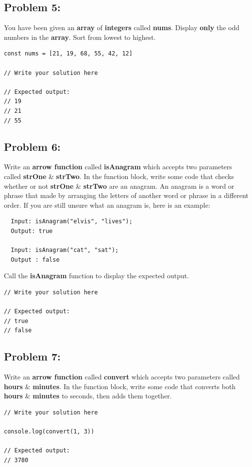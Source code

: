 \documentclass{article}
\begin{document}
\subsection*{Problem 5:}
You have been given an \textbf{array} of \textbf{integers} called \textbf{nums}. Display \textbf{only} the odd numbers in the \textbf{array}. Sort from lowest to highest.

\begin{verbatim}
const nums = [21, 19, 68, 55, 42, 12]
      
// Write your solution here

// Expected output:
// 19
// 21
// 55
\end{verbatim}

\subsection*{Problem 6:}
Write an \textbf{arrow function} called \textbf{isAnagram} which accepts two parameters called \textbf{strOne} \& \textbf{strTwo}. In the function block, write some code that checks whether or not \textbf{strOne} \& \textbf{strTwo} are an anagram. An anagram is a word or phrase that made by arranging the letters of another word or phrase in a different order. If you are still unsure what an anagram is, here is an example:

\begin{verbatim}
  Input: isAnagram("elvis", "lives");
  Output: true

  Input: isAnagram("cat", "sat");
  Output : false
\end{verbatim}

Call the \textbf{isAnagram} function to display the expected output.

\begin{verbatim}
// Write your solution here

// Expected output:
// true
// false
\end{verbatim}

\subsection*{Problem 7:}
Write an \textbf{arrow function} called \textbf{convert} which accepts two parameters called \textbf{hours} \& \textbf{minutes}. In the function block, write some code that converts both \textbf{hours} \& \textbf{minutes} to seconds, then adds them together.

\begin{verbatim}
// Write your solution here

console.log(convert(1, 3))

// Expected output:
// 3780
\end{verbatim}
\end{document}
